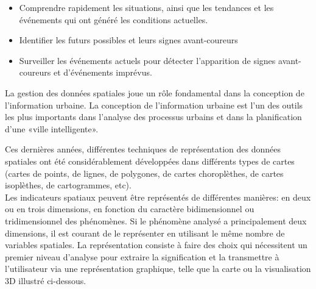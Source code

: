 \documentclass[french, a4paper, 12pt]{report}
\begin{document}
\begin{itemize}
\item Comprendre rapidement les situations, ainsi que les tendances et les événements qui ont généré les conditions actuelles.
\item Identifier les futurs possibles et leurs signes avant-coureurs
\item Surveiller les événements actuels pour détecter l'apparition de signes avant-coureurs et d'événements imprévus.\\
\end{itemize}

La gestion des données spatiales joue un rôle fondamental dans la conception de l’information urbaine. La conception de l'information urbaine est l'un des outils les plus importants dans l'analyse des processus urbains et dans la planification d'une «ville intelligente».

Ces dernières années, différentes techniques de représentation des données spatiales ont été considérablement développées dans différents types de cartes (cartes de points, de lignes, de polygones, de cartes choroplèthes, de cartes isoplèthes, de cartogrammes, etc).\\ Les indicateurs spatiaux peuvent être représentés de différentes manières: en deux ou en trois dimensions, en fonction du caractère bidimensionnel ou tridimensionnel des phénomènes. Si le phénomène analysé a principalement deux dimensions, il est courant de le représenter en utilisant le même nombre de variables spatiales. 
La représentation consiste à faire des choix qui nécessitent un premier niveau d’analyse pour extraire la signification et la transmettre à l’utilisateur via une représentation graphique, telle que la carte ou la visualisation 3D illustré ci-dessous. 
\end{document}
